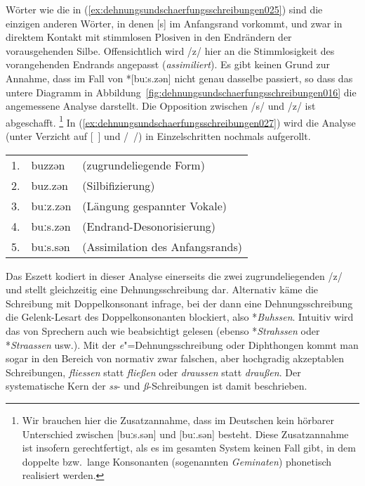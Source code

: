 Wörter wie die in (\ref{ex:dehnungsundschaerfungsschreibungen025}) sind die einzigen anderen Wörter, in denen [s] im Anfangsrand vorkommt, und zwar in direktem Kontakt mit stimmlosen Plosiven in den Endrändern der vorausgehenden Silbe.
Offensichtlich wird /z/ hier an die Stimmlosigkeit des vorangehenden Endrands angepasst (\textit{assimiliert}).
Es gibt keinen Grund zur Annahme, dass im Fall von *[buːs.zən] nicht genau dasselbe passiert, so dass das untere Diagramm in Abbildung~\ref{fig:dehnungsundschaerfungsschreibungen016} die angemessene Analyse darstellt.
Die Opposition zwischen /s/ und /z/ ist abgeschafft.%
\footnote{Wir brauchen hier die Zusatzannahme, dass im Deutschen kein hörbarer Unterschied zwischen [buːs.sən] und [buː.sən] besteht.
Diese Zusatzannahme ist insofern gerechtfertigt, als es im gesamten System keinen Fall gibt, in dem doppelte bzw.\ lange Konsonanten (sogenannten \textit{Geminaten}) phonetisch realisiert werden.}
In (\ref{ex:dehnungsundschaerfungsschreibungen027}) wird die Analyse (unter Verzicht auf [~] und /~/) in Einzelschritten nochmals aufgerollt.

\begin{exe}
  \ex\label{ex:dehnungsundschaerfungsschreibungen027} \begin{tabular}[t]{lll}
     1. & buzzən & (zugrundeliegende Form) \\
     2. & buz.zən & (Silbifizierung) \\
     3. & buːz.zən & (Längung gespannter Vokale) \\
     4. & buːs.zən & (Endrand-Desonorisierung) \\
     5. & buːs.sən & (Assimilation des Anfangsrands) \\
  \end{tabular}
\end{exe}


Das Eszett kodiert in dieser Analyse einerseits die zwei zugrundeliegenden /z/ und stellt gleichzeitig eine Dehnungsschreibung dar.
Alternativ käme die Schreibung mit Doppelkonsonant infrage, bei der dann eine Dehnungsschreibung die Gelenk-Lesart des Doppelkonsonanten blockiert, also *\textit{Buhssen}.
Intuitiv wird das von Sprechern auch wie beabsichtigt gelesen (ebenso *\textit{Strahssen} oder *\textit{Straassen} usw.).
Mit der \textit{e}"=Dehnungsschreibung oder Diphthongen kommt man sogar in den Bereich von normativ zwar falschen, aber hochgradig akzeptablen Schreibungen, \zB \textit{fliessen} statt \textit{fließen} oder \textit{draussen} statt \textit{draußen}.
Der systematische Kern der \textit{ss}- und \textit{ß}-Schreibungen ist damit beschrieben.



